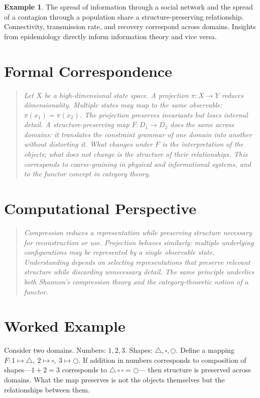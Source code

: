 \documentclass[11pt]{book}
\theoremstyle{plain}
\theoremstyle{definition}
\newtheorem{example}[theorem]{Example}
\theoremstyle{remark}
\newenvironment{formalcorrespondence}
  {\begin{quote}\small\itshape}
  {\end{quote}}
\newenvironment{computationalaside}
  {\begin{quote}\small\itshape}
  {\end{quote}}
\begin{document}
\begin{example}
The spread of information through a social network and the spread of a
contagion through a population share a structure-preserving relationship.
Connectivity, transmission rate, and recovery correspond across domains.
Insights from epidemiology directly inform information theory and vice versa.
\end{example}

\section*{Formal Correspondence}
\begin{formalcorrespondence}
Let $X$ be a high-dimensional state space. A projection $\pi : X \to Y$
reduces dimensionality. Multiple states may map to the same observable:
$\pi(x_1) = \pi(x_2)$. The projection preserves invariants but loses
internal detail. A structure-preserving map $F : D_1 \to D_2$ does the
same across domains: it translates the constraint grammar of one domain
into another without distorting it. What changes under $F$ is the
interpretation of the objects; what does not change is the structure of
their relationships. This corresponds to coarse-graining in physical and
informational systems, and to the functor concept in category theory.
\end{formalcorrespondence}

\section*{Computational Perspective}
\begin{computationalaside}
Compression reduces a representation while preserving structure necessary
for reconstruction or use. Projection behaves similarly: multiple
underlying configurations may be represented by a single observable
state. Understanding depends on selecting representations that preserve
relevant structure while discarding unnecessary detail. The same
principle underlies both Shannon's compression theory and the
category-theoretic notion of a functor.
\end{computationalaside}

\section*{Worked Example}
Consider two domains. Numbers: $1, 2, 3$. Shapes: $\triangle, \square,
\bigcirc$. Define a mapping $F: 1 \mapsto \triangle,\ 2 \mapsto \square,\
3 \mapsto \bigcirc$. If addition in numbers corresponds to composition of
shapes---$1 + 2 = 3$ corresponds to $\triangle \circ \square = \bigcirc$---
then structure is preserved across domains. What the map preserves is not
the objects themselves but the relationships between them.
\end{document}
